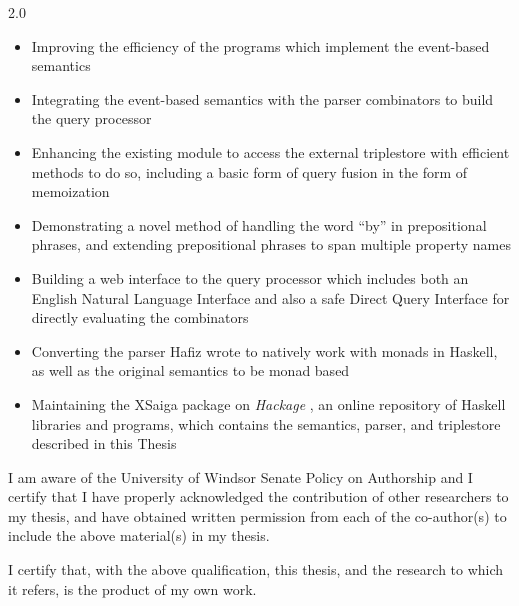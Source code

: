 \documentclass[fleqn, oneside, 12pt]{book}
\theoremstyle{definitionsty}
\newcommand{\uwindoublespacelen}{2.0}
\newcommand{\uwindefaultspacelen}{\uwindoublespacelen}
\newenvironment{uwindefaultspaceenv}%
{\begin{spacing}{\uwindefaultspacelen}}%
	{\end{spacing}}
\begin{document}
\begin{uwindefaultspaceenv}
	\begin{itemize}
		\item Improving the efficiency of the programs which implement the event-based semantics
		\item Integrating the event-based semantics with the parser combinators to build the query processor
		\item Enhancing the existing module to access the external triplestore with efficient methods to do so, including a basic form of query fusion in the form of memoization
		\item Demonstrating a novel method of handling the word ``by'' in prepositional phrases, and extending prepositional phrases to span multiple property names
		\item Building a web interface to the query processor which includes both an English Natural Language Interface and also a safe Direct Query Interface for directly evaluating the combinators
		\item Converting the parser Hafiz wrote\cite{frosthafiz2008} to natively work with monads in Haskell, as well as the original semantics \cite{frost2014demonstration} to be monad based
		\item Maintaining the XSaiga package on {\em Hackage} \cite{XSaiga:2016}, an online repository of Haskell libraries and programs, which contains the semantics, parser, and triplestore described in this Thesis
	\end{itemize}
	
	I am aware of the University of Windsor Senate Policy on Authorship and I certify that I have properly acknowledged the contribution of other researchers to my thesis, and have obtained written permission from each of the co-author(s) to include the above material(s) in my thesis. 
	
	I certify that, with the above qualification, this thesis, and the research to which it refers, is the product of my own work.
	
\end{uwindefaultspaceenv}
\end{document}
